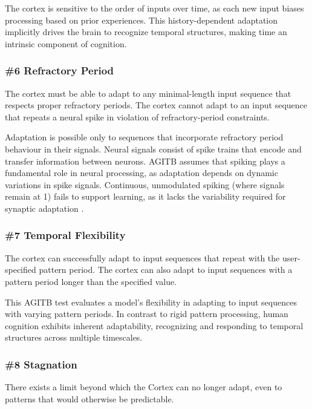 \documentclass{article}
\newenvironment{one_assertion}[1]
{
  \begin{tabular}{p{1.5cm}p{8.2cm}}
    \textbf{Assertion:} & #1 \\
}{
  \end{tabular}\\
}
\newenvironment{two_assertions}[2]
{
  \begin{tabular}{p{1.5cm}p{8.2cm}}
    \textbf{Assertion:} & #1 \\
    \textbf{Assertion:} & #2 \\
}{
  \end{tabular}\\
}
\begin{document}
The cortex is sensitive to the order of inputs over time, as each new input biases processing based on prior experiences. This history-dependent adaptation implicitly drives the brain to recognize temporal structures, making time an intrinsic component of cognition.


\subsubsection*{\#6 Refractory Period}
\begin{two_assertions}
    {The cortex must be able to adapt to any minimal-length input sequence that respects proper refractory periods.}
    {The cortex cannot adapt to an input sequence that repeats a neural spike in violation of refractory-period constraints.}
\end{two_assertions}

Adaptation is possible only to sequences that incorporate refractory period behaviour in their signals. Neural signals consist of spike trains that encode and transfer information between neurons. AGITB assumes that spiking plays a fundamental role in neural processing, as adaptation depends on dynamic variations in spike signals. Continuous, unmodulated spiking (where signals remain at 1) fails to support learning, as it lacks the variability required for synaptic adaptation \cite{Gerstner2002}. 

\subsubsection*{\#7 Temporal Flexibility}
\begin{two_assertions}
    {The cortex can successfully adapt to input sequences that repeat with the user-specified pattern period.}
    {The cortex can also adapt to input sequences with a pattern period longer than the specified value.}
\end{two_assertions}

This AGITB test evaluates a model’s flexibility in adapting to input sequences with varying pattern periods. In contrast to rigid pattern processing, human cognition exhibits inherent adaptability, recognizing and responding to temporal structures across multiple timescales.

\subsubsection*{\#8 Stagnation}
\begin{one_assertion}
    {There exists a limit beyond which the Cortex can no longer adapt, even to patterns that would otherwise be predictable.}
\end{one_assertion}
\end{document}

